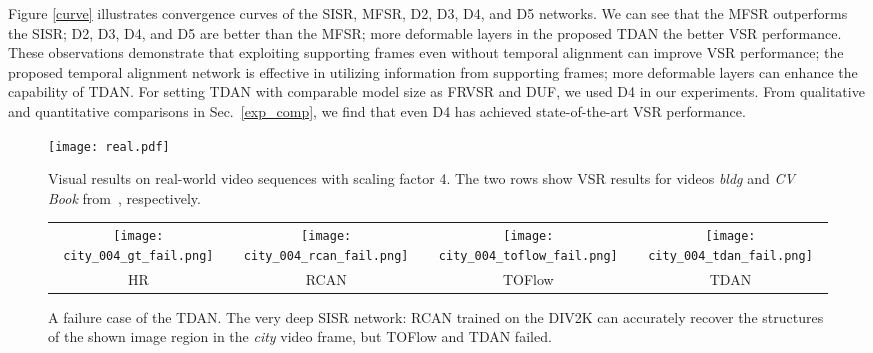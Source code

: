 \documentclass[10pt,twocolumn,letterpaper]{article}
\begin{document}
Figure \ref{curve} illustrates convergence curves of the SISR, MFSR, D2, D3, D4, and D5 networks. We can see that the MFSR outperforms the SISR; D2, D3, D4, and D5 are better than the MFSR; more deformable layers in the proposed TDAN the better VSR performance. These observations demonstrate that exploiting supporting frames even without temporal alignment can improve VSR performance; the proposed temporal alignment network is effective in utilizing information from supporting frames; more deformable layers can enhance the capability of TDAN. For setting TDAN with comparable model size as FRVSR and DUF, we used D4 in our experiments. From qualitative and quantitative comparisons in Sec.~\ref{exp_comp}, we find that even D4 has achieved state-of-the-art VSR performance.

\begin{figure}
\texttt{[image: real.pdf]}
\caption{Visual results on real-world video sequences with scaling factor 4. The two rows show VSR results for videos \textit{bldg} and \textit{CV Book} from~\cite{Liao_2015_ICCV}, respectively.}
	\label{fig:real}
\end{figure}
\begin{figure}
	\scriptsize
	\centering

		\begin{adjustbox}{valign=t}
\begin{tabular}{cccc}
				\texttt{[image: city\_004\_gt\_fail.png]} \hspace{-3mm} &
				\texttt{[image: city\_004\_rcan\_fail.png]}\hspace{-3mm} &
				\texttt{[image: city\_004\_toflow\_fail.png]}\hspace{-3mm} &
				\texttt{[image: city\_004\_tdan\_fail.png]}
				\\
				HR \hspace{-3mm} &
				RCAN \hspace{-3mm} &
				TOFlow \hspace{-3mm} &
				TDAN
				\\
			\end{tabular}
			\end{adjustbox}
	\caption{A failure case of the TDAN. The very deep SISR network: RCAN trained on the DIV2K can accurately recover the structures of the shown image region in the \textit{city} video frame, but TOFlow and TDAN failed.}
	\label{failure}
\end{figure}
\end{document}
